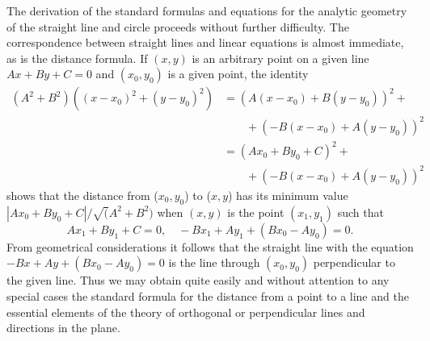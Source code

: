 The derivation of the standard formulas and equations for the analytic
geometry of the straight line and circle proceeds without further
difficulty. The correspondence between straight lines and linear
equations is almost immediate, as is the distance formula. If $(x,y)$
is an arbitrary point on a given line $Ax + By + C = 0$ and $(x_0 ,
y_0)$ is a given point, the identity
\begin{align*}
(A^2+ B^2) ((x-x_0)^2 + (y-y_0)^2) & = (A (x-x_0) + B(y-y_0))^2 +\\
& \qquad + (-B(x-x_0) + A (y - y_0))^2\\
& = (Ax_0 + By_0 + C)^2  +\\
& \qquad + (-B (x-x_0) + A(y-y_0))^2
\end{align*}
shows that the distance from ($x_0, y_0$) to ($x,y$) has its minimum
value $|Ax_0 + By_0 + C| / \surd (A^2+B^2)$ when $(x,y)$ is the point
$(x_1, y_1)$ such that 
$$
Ax_1 + By_1 + C = 0, \quad - Bx_1 + Ay_1 + (Bx_0 - Ay_0) = 0.
$$
From geometrical considerations it follows that the straight line with
the equation $-Bx + Ay + (Bx_0 - Ay_0) =0$ is the line through $(x_0,
y_0)$ perpendicular to the given line. Thus we may obtain quite easily
and without attention to any special cases the standard formula for
the distance from a point to a line and the essential elements of the
theory of orthogonal or perpendicular lines and directions in the plane.

